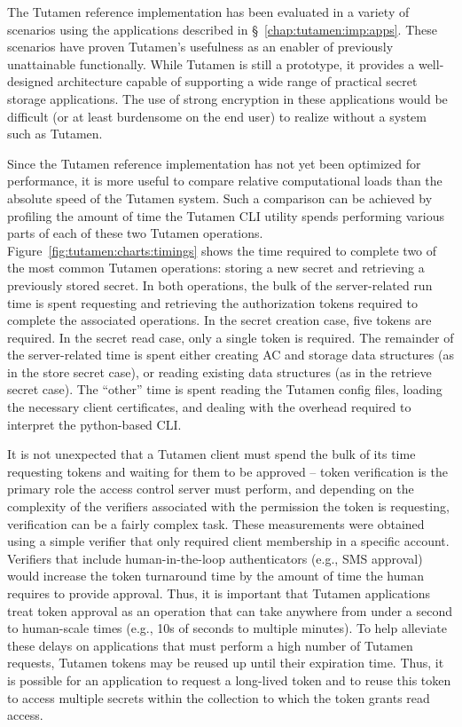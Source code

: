 The Tutamen reference implementation has been evaluated in a variety
of scenarios using the applications described in
\S~\ref{chap:tutamen:imp:apps}. These scenarios have proven Tutamen's
usefulness as an enabler of previously unattainable
functionally. While Tutamen is still a prototype, it provides a
well-designed architecture capable of supporting a wide range of
practical secret storage applications. The use of strong encryption in
these applications would be difficult (or at least burdensome on the
end user) to realize without a system such as Tutamen.

Since the Tutamen reference implementation has not yet been optimized
for performance, it is more useful to compare relative computational
loads than the absolute speed of the Tutamen system. Such a comparison
can be achieved by profiling the amount of time the Tutamen CLI
utility spends performing various parts of each of these two Tutamen
operations. Figure~\ref{fig:tutamen:charts:timings} shows the time
required to complete two of the most common Tutamen operations:
storing a new secret and retrieving a previously stored secret. In
both operations, the bulk of the server-related run time is spent
requesting and retrieving the authorization tokens required to
complete the associated operations. In the secret creation case, five
tokens are required. In the secret read case, only a single token is
required. The remainder of the server-related time is spent either
creating AC and storage data structures (as in the store secret case),
or reading existing data structures (as in the retrieve secret
case). The ``other'' time is spent reading the Tutamen config files,
loading the necessary client certificates, and dealing with the
overhead required to interpret the python-based CLI.

It is not unexpected that a Tutamen client must spend the bulk of its
time requesting tokens and waiting for them to be approved -- token
verification is the primary role the access control server must
perform, and depending on the complexity of the verifiers associated
with the permission the token is requesting, verification can be a
fairly complex task. These measurements were obtained using a simple
verifier that only required client membership in a specific
account. Verifiers that include human-in-the-loop authenticators
(e.g., SMS approval) would increase the token turnaround time by the
amount of time the human requires to provide approval. Thus, it is
important that Tutamen applications treat token approval as an
operation that can take anywhere from under a second to human-scale
times (e.g., 10s of seconds to multiple minutes). To help alleviate
these delays on applications that must perform a high number of
Tutamen requests, Tutamen tokens may be reused up until their
expiration time. Thus, it is possible for an application to request a
long-lived token and to reuse this token to access multiple secrets
within the collection to which the token grants read access.

